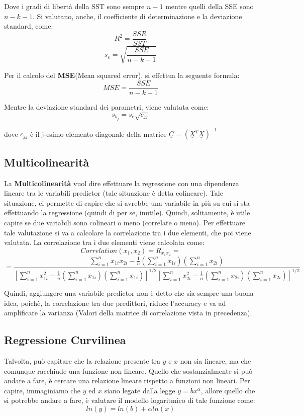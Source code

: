 Dove i gradi di libertà della SST sono sempre \(n-1\) mentre quelli della SSE sono \(n-k-1\). Si valutano, anche, il coefficiente di determinazione e la deviazione standard, come:
\[
R^2 = \frac{SSR}{SST}
\]
\[
s_e = \sqrt{\frac{SSE}{n-k-1}}
\]

Per il calcolo del \textbf{MSE}(Mean squared error), si effettua la seguente formula:
\[
MSE = \frac{SSE}{n-k-1}
\]

Mentre la deviazione standard dei parametri, viene valutata come:
\[
s_{b_j} = s_e\sqrt{c_{jj}} 
\]

dove \(c_{jj}\) è il j-esimo elemento diagonale della matrice \(\underline{\underline{C}} = (\underline{\underline{X}}^T\underline{\underline{X}})^{-1}\)

\subsection{Multicolinearità}
La \textbf{Multicolinearità} vuol dire effettuare la regressione con una dipendenza lineare tra le variabili predictor (tale situazione è detta colineare). Tale situazione, ci permette di capire che si avrebbe una variabile in più su cui si sta effettuando la regressione (quindi di per se, inutile). Quindi, solitamente, è utile capire se due variabili sono colineari o meno (correlate o meno). Per effettuare tale valutazione si va a calcolare la correlazione tra i due elementi, che poi viene valutata.
La correlazione tra i due elementi viene calcolata come:
\[
Correlation(x_1,x_2) = R_{x_1x_2} = 
\]
\[
=\frac{\sum_{i=1}^{n}x_{1i}x_{2i} - \frac{1}{n}\left(\sum_{i=1}^{n}x_{1i}\right)\left(\sum_{i=1}^{n}x_{2i}\right)}{\left[\sum_{i=1}^{n}x_{1i}^2 - \frac{1}{n}\left(\sum_{i=1}^{n}x_{1i}\right)\left(\sum_{i=1}^{n}x_{1i}\right) \right]^{1/2}\left[\sum_{i=1}^{n}x_{2i}^2 - \frac{1}{n}\left(\sum_{i=1}^{n}x_{2i}\right)\left(\sum_{i=1}^{n}x_{2i}\right) \right]^{1/2}}
\]

Quindi, aggiungere una variabile predictor non è detto che sia sempre una buona idea, poichè, la correlazione tra due predittori, riduce l'accuracy e va ad amplificare la varianza (Valori della matrice di correlazione vista in precedenza). 

\subsection{Regressione Curvilinea}
Talvolta, può capitare che la relazione presente tra \(y\) e \(x\) non sia lineare, ma che comunque racchiude una funzione non lineare. Quello che sostanzialmente si può andare a fare, è cercare una relazione lineare rispetto a funzioni non lineari. Per capire, immaginiamo che \(y\) ed \(x\) siano legate dalla legge \(y = bx^\alpha\), allore quello che si potrebbe andare a fare, è valutare il modello logaritmico di tale funzione come:
\[
ln(y) = ln(b)+ \alpha ln(x)
\]


